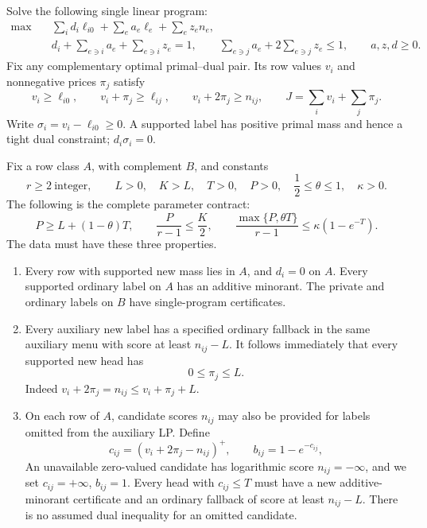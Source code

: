Solve the following single linear program:
\begin{equation}\label{simp:hybrid-lp}
 \begin{split}
 \max\quad&\sum_i d_i\ell_{i0}+\sum_e a_e\ell_e+\sum_e z_en_e,\\
 &d_i+\sum_{e\ni i}a_e+\sum_{e\ni i}z_e=1,\qquad
   \sum_{e\ni j}a_e+2\sum_{e\ni j}z_e\le1,
 \qquad a,z,d\ge0.
 \end{split}
\end{equation}
Fix any complementary optimal primal--dual pair.  Its row values $v_i$
and nonnegative prices $\pi_j$ satisfy
\[
 v_i\ge\ell_{i0},\qquad v_i+\pi_j\ge\ell_{ij},\qquad
 v_i+2\pi_j\ge n_{ij},\qquad J=\sum_i v_i+\sum_j\pi_j.
\]
Write $\sigma_i=v_i-\ell_{i0}\ge0$.  A supported label has positive
primal mass and hence a tight dual constraint; $d_i\sigma_i=0$.

Fix a row class $A$, with complement $B$, and constants
\[
 r\ge2\ \text{integer},\qquad L>0,\quad K>L,\quad T>0,
 \quad P>0,\quad\frac12\le\theta\le1,\quad\kappa>0.
\]
The following is the complete parameter contract:
\begin{equation}\label{simp:graph-parameters}
 \boxed{\quad
 P\ge L+(1-\theta)T,\qquad
 \frac P{r-1}\le\frac K2,\qquad
 \frac{\max\{P,\theta T\}}{r-1}
                 \le\kappa(1-e^{-T}).\quad}
\end{equation}
The data must have these three properties.

\begin{enumerate}
\item Every row with supported new mass lies in $A$, and $d_i=0$ on
$A$.  Every supported ordinary label on $A$ has an additive minorant.
The private and ordinary labels on $B$ have single-program certificates.
\item Every auxiliary new label has a specified ordinary fallback in
the same auxiliary menu with score at least $n_{ij}-L$.
It follows immediately that every supported new head has
\begin{equation}\label{simp:new-price}
                         0\le\pi_j\le L.
\end{equation}
Indeed $v_i+2\pi_j=n_{ij}\le v_i+\pi_j+L$.
\item On each row of $A$, candidate scores $n_{ij}$ may also be provided
for labels omitted from the auxiliary LP.  Define
\[
 c_{ij}=(v_i+2\pi_j-n_{ij})^+,\qquad
 b_{ij}=1-e^{-c_{ij}},
\]
An unavailable zero-valued candidate has logarithmic score
$n_{ij}=-\infty$, and we set $c_{ij}=+\infty$, $b_{ij}=1$.
Every head with $c_{ij}\le T$ must have a new additive-minorant
certificate and an ordinary fallback of score at least $n_{ij}-L$.
There is no assumed dual inequality for an omitted candidate.
\end{enumerate}

